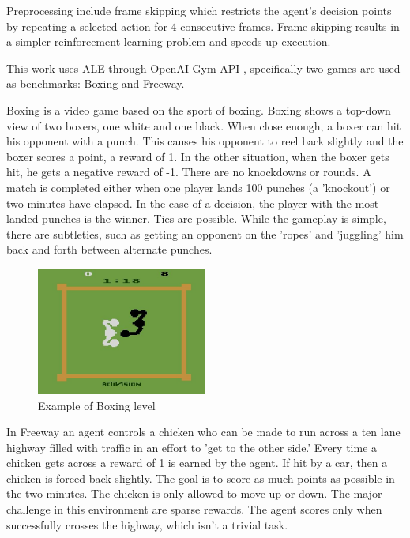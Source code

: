 Preprocessing include frame skipping \cite{Study.FrameSkipping} which restricts the agent’s decision points by repeating a selected action for 4 consecutive frames. Frame skipping results in a simpler reinforcement learning problem and speeds up execution.

This work uses ALE through OpenAI Gym API \cite{Code.OpenAIGym}, specifically two games are used as benchmarks: Boxing and Freeway.

Boxing is a video game based on the sport of boxing. Boxing shows a top-down view of two boxers, one white and one black. When close enough, a boxer can hit his opponent with a punch. This causes his opponent to reel back slightly and the boxer scores a point, a reward of 1. In the other situation, when the boxer gets hit, he gets a negative reward of -1. There are no knockdowns or rounds. A match is completed either when one player lands 100 punches (a 'knockout') or two minutes have elapsed. In the case of a decision, the player with the most landed punches is the winner. Ties are possible. 
While the gameplay is simple, there are subtleties, such as getting an opponent on the 'ropes' and 'juggling' him back and forth between alternate punches. 

\begin{figure}[H]
\includegraphics[width=0.5\textwidth,keepaspectratio]{figures/Boxing.jpg}
\caption[Sokoban]{Example of Boxing level}
\label{Fig.Boxing}
\end{figure}

In Freeway an agent controls a chicken who can be made to run across a ten lane highway filled with traffic in an effort to 'get to the other side.' Every time a chicken gets across a reward of 1 is earned by the agent. If hit by a car, then a chicken is forced back slightly. The goal is to score as much points as possible in the two minutes. The chicken is only allowed to move up or down. 
The major challenge in this environment are sparse rewards. The agent scores only when successfully crosses the highway, which isn't a trivial task.

